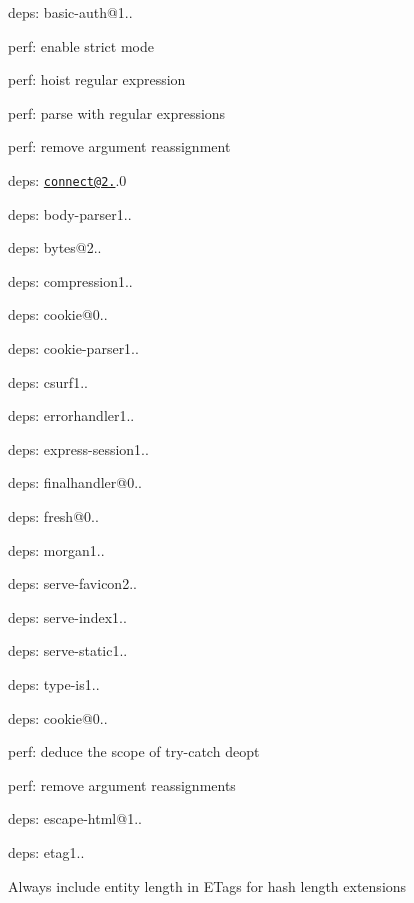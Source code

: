 {\ttfamily 
\begin{DoxyItemize}
\item deps\+: basic-\/auth@1..
\begin{DoxyItemize}
\item perf\+: enable strict mode
\item perf\+: hoist regular expression
\item perf\+: parse with regular expressions
\item perf\+: remove argument reassignment
\end{DoxyItemize}
\item deps\+: \href{mailto:connect@2.30}{\tt connect@2.}.0
\begin{DoxyItemize}
\item deps\+: body-\/parser1..
\item deps\+: bytes@2..
\item deps\+: compression1..
\item deps\+: cookie@0..
\item deps\+: cookie-\/parser1..
\item deps\+: csurf1..
\item deps\+: errorhandler1..
\item deps\+: express-\/session1..
\item deps\+: finalhandler@0..
\item deps\+: fresh@0..
\item deps\+: morgan1..
\item deps\+: serve-\/favicon2..
\item deps\+: serve-\/index1..
\item deps\+: serve-\/static1..
\item deps\+: type-\/is1..
\end{DoxyItemize}
\item deps\+: cookie@0..
\begin{DoxyItemize}
\item perf\+: deduce the scope of try-\/catch deopt
\item perf\+: remove argument reassignments
\end{DoxyItemize}
\item deps\+: escape-\/html@1..
\item deps\+: etag1..
\begin{DoxyItemize}
\item Always include entity length in E\+Tags for hash length extensions

\end{DoxyItemize}
\end{DoxyItemize}}
